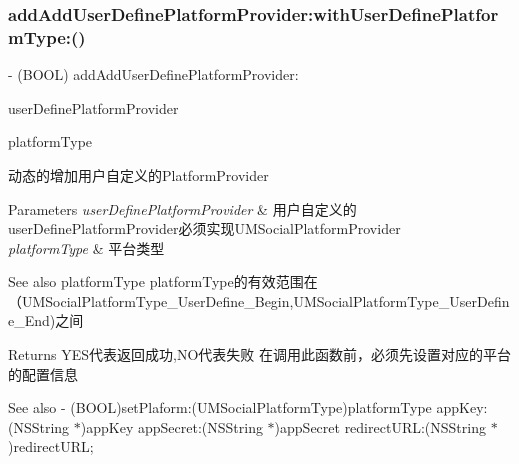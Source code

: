 \subsubsection{\texorpdfstring{add\+Add\+User\+Define\+Platform\+Provider\+:with\+User\+Define\+Platform\+Type\+:()}{addAddUserDefinePlatformProvider:withUserDefinePlatformType:()}\hspace{0.1cm}{\footnotesize\ttfamily [2/2]}}
{\footnotesize\ttfamily -\/ (B\+O\+OL) add\+Add\+User\+Define\+Platform\+Provider\+: \begin{DoxyParamCaption}\item[{(id$<$ U\+M\+Social\+Platform\+Provider $>$)}]{user\+Define\+Platform\+Provider }\item[{withUserDefinePlatformType:(U\+M\+Social\+Platform\+Type)}]{platform\+Type }\end{DoxyParamCaption}}

动态的增加用户自定义的\+Platform\+Provider


\begin{DoxyParams}{Parameters}
{\em user\+Define\+Platform\+Provider} & 用户自定义的user\+Define\+Platform\+Provider必须实现\+U\+M\+Social\+Platform\+Provider \\
\hline
{\em platform\+Type} & 平台类型 \\
\hline
\end{DoxyParams}
\begin{DoxySeeAlso}{See also}
platform\+Type platform\+Type的有效范围在 （\+U\+M\+Social\+Platform\+Type\+\_\+\+User\+Define\+\_\+\+Begin,U\+M\+Social\+Platform\+Type\+\_\+\+User\+Define\+\_\+\+End)之间
\end{DoxySeeAlso}
\begin{DoxyReturn}{Returns}
Y\+E\+S代表返回成功,N\+O代表失败  在调用此函数前，必须先设置对应的平台的配置信息 
\end{DoxyReturn}
\begin{DoxySeeAlso}{See also}
-\/ (B\+O\+OL)set\+Plaform\+:(\+U\+M\+Social\+Platform\+Type)platform\+Type app\+Key\+:(\+N\+S\+String $\ast$)app\+Key app\+Secret\+:(\+N\+S\+String $\ast$)app\+Secret redirect\+U\+R\+L\+:(\+N\+S\+String $\ast$)redirect\+U\+RL; 
\end{DoxySeeAlso}
\mbox{\label{interface_u_m_social_manager_ad5b73eb1c63bd9e2b62f2e01e079af61}} 
